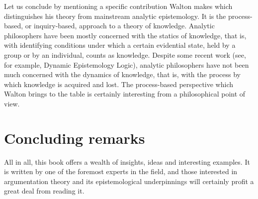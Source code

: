 \documentclass[12pt]{article}
\begin{document}

Let us conclude by mentioning 
a specific contribution Walton makes which distinguishes his theory   
from mainstream analytic epistemology. It is the process-based, or
inquiry-based, approach to a theory of knowledge. Analytic
philosophers have been mostly concerned with the statics of knowledge, 
that is, with identifying conditions under which a certain
evidential state, held by a group or by an individual, counts as
knowledge. Despite some recent work (see, for example, 
Dynamic Epistemology Logic), analytic philosophers have not
been much concerned with the dynamics of knowledge, that is, with
the process by which knowledge is acquired and lost. The process-based
perspective which Walton brings to the table is certainly interesting
from a philosophical point of view.

\section{Concluding remarks}

\noindent All in all, this book offers a wealth of
insights, ideas and interesting examples. It is written by one of the
foremost experts in the field, and those interested in argumentation
theory and its epistemological underpinnings will certainly profit a
great deal from reading it.
\end{document}
